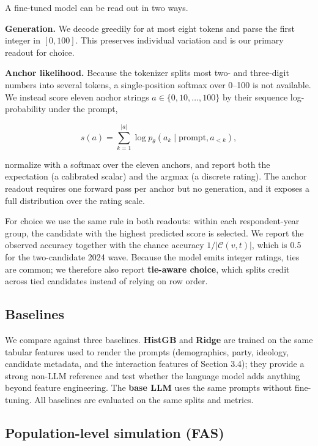 A fine-tuned model can be read out in two ways.

\textbf{Generation.} We decode greedily for at most eight tokens and
parse the first integer in \([0,100]\). This preserves individual
variation and is our primary readout for choice.

\textbf{Anchor likelihood.} Because the tokenizer splits most two- and
three-digit numbers into several tokens, a single-position softmax over
0--100 is not available. We instead score eleven anchor strings
\(a\in\{0,10,\dots,100\}\) by their sequence log-probability under the
prompt,

\[
s(a)=\sum_{k=1}^{|a|}\log p_\theta\!\left(a_k \mid \text{prompt}, a_{<k}\right),
\]

normalize with a softmax over the eleven anchors, and report both the
expectation (a calibrated scalar) and the argmax (a discrete rating).
The anchor readout requires one forward pass per anchor but no
generation, and it exposes a full distribution over the rating scale.

For choice we use the same rule in both readouts: within each
respondent-year group, the candidate with the highest predicted score is
selected. We report the observed accuracy together with the chance
accuracy \(1/|\mathcal{C}(v,t)|\), which is 0.5 for the two-candidate
2024 wave. Because the model emits integer ratings, ties are common; we
therefore also report \textbf{tie-aware choice}, which splits credit
across tied candidates instead of relying on row order.

\subsection{Baselines}\label{baselines}

We compare against three baselines. \textbf{HistGB}
\citep{friedman2001gbm} and \textbf{Ridge} are trained on the same
tabular features used to render the prompts (demographics, party,
ideology, candidate metadata, and the interaction features of Section
3.4); they provide a strong non-LLM reference and test whether the
language model adds anything beyond feature engineering. The
\textbf{base LLM} uses the same prompts without fine-tuning. All
baselines are evaluated on the same splits and metrics.

\subsection{Population-level simulation
(FAS)}\label{population-level-simulation-fas}


